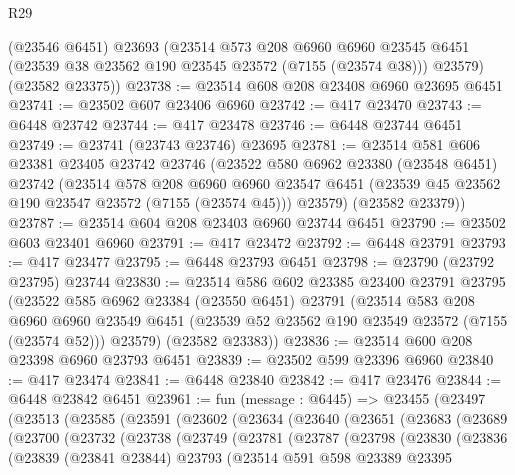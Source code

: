 \begin{lexlean}{R29}
\begin{coremodule}
      (@23546 @6451)
      @23693
      (@23514
        @573
        @208
        @6960
        @6960
        @23545
        @6451
        (@23539 @38 @23562 @190 @23545 @23572 (@7155 (@23574 @38)))
        @23579)
      (@23582 @23375))
@23738 := @23514 @608 @208 @23408 @6960 @23695 @6451
@23741 := @23502 @607 @23406 @6960
@23742 := @417 @23470
@23743 := @6448 @23742
@23744 := @417 @23478
@23746 := @6448 @23744 @6451
@23749 := @23741 (@23743 @23746) @23695
@23781 := @23514
    @581
    @606
    @23381
    @23405
    @23742
    @23746
    (@23522
      @580
      @6962
      @23380
      (@23548 @6451)
      @23742
      (@23514
        @578
        @208
        @6960
        @6960
        @23547
        @6451
        (@23539 @45 @23562 @190 @23547 @23572 (@7155 (@23574 @45)))
        @23579)
      (@23582 @23379))
@23787 := @23514 @604 @208 @23403 @6960 @23744 @6451
@23790 := @23502 @603 @23401 @6960
@23791 := @417 @23472
@23792 := @6448 @23791
@23793 := @417 @23477
@23795 := @6448 @23793 @6451
@23798 := @23790 (@23792 @23795) @23744
@23830 := @23514
    @586
    @602
    @23385
    @23400
    @23791
    @23795
    (@23522
      @585
      @6962
      @23384
      (@23550 @6451)
      @23791
      (@23514
        @583
        @208
        @6960
        @6960
        @23549
        @6451
        (@23539 @52 @23562 @190 @23549 @23572 (@7155 (@23574 @52)))
        @23579)
      (@23582 @23383))
@23836 := @23514 @600 @208 @23398 @6960 @23793 @6451
@23839 := @23502 @599 @23396 @6960
@23840 := @417 @23474
@23841 := @6448 @23840
@23842 := @417 @23476
@23844 := @6448 @23842 @6451
@23961 := fun (message : @6445) =>
  @23455
    (@23497
      (@23513
        (@23585
          (@23591
            (@23602
              (@23634
                (@23640
                  (@23651
                    (@23683
                      (@23689
                        (@23700
                          (@23732
                            (@23738
                              (@23749
                                (@23781
                                  (@23787
                                    (@23798
                                      (@23830
                                        (@23836
                                          (@23839
                                            (@23841 @23844)
                                            @23793
                                            (@23514
                                              @591
                                              @598
                                              @23389
                                              @23395

\end{coremodule}
\end{lexlean}
